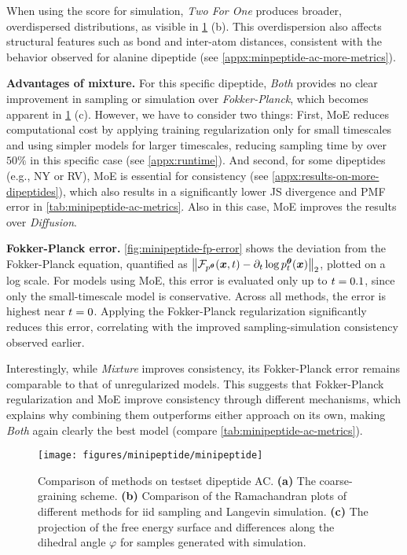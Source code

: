 When using the score for simulation, \emph{Two For One} produces broader, overdispersed distributions, as visible in \cref{fig:minipeptide-inference} (b). This overdispersion also affects structural features such as bond and inter-atom distances, consistent with the behavior observed for alanine dipeptide (see \cref{appx:minpeptide-ac-more-metrics}).

\textbf{Advantages of mixture.} 
For this specific dipeptide, \emph{Both} provides no clear improvement in sampling or simulation over \emph{Fokker-Planck}, which becomes apparent in \cref{fig:minipeptide-inference} (c). However, we have to consider two things: First, \gls{MoE} reduces computational cost by applying training regularization only for small timescales and using simpler models for larger timescales, reducing sampling time by over $50\%$ in this specific case (see \cref{appx:runtime}). And second, for some dipeptides (e.g., NY or RV), \gls{MoE} is essential for consistency (see \cref{appx:results-on-more-dipeptides}), which also results in a significantly lower \gls{JS} divergence and \gls{PMF} error in \cref{tab:minipeptide-ac-metrics}. Also in this case, \gls{MoE} improves the results over \emph{Diffusion}.


\textbf{Fokker-Planck error.}
\cref{fig:minipeptide-fp-error} shows the deviation from the Fokker-Planck equation, quantified as $\left\Vert {\mathcal{F}}_{p^{\bm{\theta}}}({{\bm{x}}}, {t}) - \partial_{t} \log p^{\bm{\theta}}_{t}({{\bm{x}}})\right\Vert_2$, plotted on a log scale. For models using \gls{MoE}, this error is evaluated only up to ${t} = 0.1$, since only the small-timescale model is conservative. Across all methods, the error is highest near ${t} = 0$. Applying the Fokker-Planck regularization significantly reduces this error, correlating with the improved sampling-simulation consistency observed earlier.

Interestingly, while \emph{Mixture} improves consistency, its Fokker-Planck error remains comparable to that of unregularized models. This suggests that Fokker-Planck regularization and \gls{MoE} improve consistency through different mechanisms, which explains why combining them outperforms either approach on its own, making \emph{Both} again clearly the best model (compare \cref{tab:minipeptide-ac-metrics}).



\begin{figure}
    \centering
    \texttt{[image: figures/minipeptide/minipeptide]}
    \caption{Comparison of methods on testset dipeptide AC. \textbf{(a)} The coarse-graining scheme. \textbf{(b)} Comparison of the Ramachandran plots of different methods for iid sampling and Langevin simulation. \textbf{(c)} The projection of the free energy surface and differences along the dihedral angle $\varphi$ for samples generated with simulation.}
    \label{fig:minipeptide-inference}
\end{figure}


